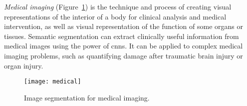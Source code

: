 \emph{Medical imaging} (Figure~\ref{fig:medical_segmentation}) is the technique
and process of creating visual representations of the interior of a body for
clinical analysis and medical intervention, as well as visual representation of
the function of some organs or tissues. Semantic segmentation can extract
clinically useful information from medical images using the power of
\glspl{cnn}. It can be applied to complex medical imaging problems, such as
quantifying damage after traumatic brain injury or organ injury.
\begin{figure}[h]
    \centering
    \texttt{[image: medical]}
    \caption{Image segmentation for medical imaging.}
    \label{fig:medical_segmentation}
\end{figure}
